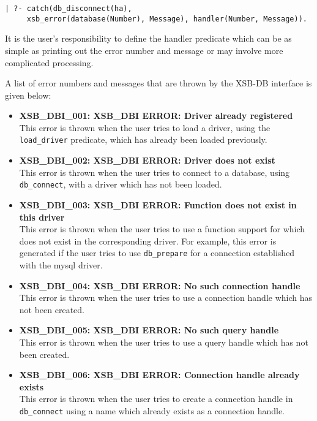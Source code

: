 \begin{verbatim}
| ?- catch(db_disconnect(ha),
     xsb_error(database(Number), Message), handler(Number, Message)).
\end{verbatim}

It is the user's responsibility to define the handler predicate which can be as simple
as printing out the error number and message or may involve more 
complicated  processing.

A list of error numbers and messages that are thrown by the XSB-DB interface
is given below:

\begin{itemize}

\item {\bf XSB\_DBI\_001: XSB\_DBI ERROR: Driver already registered}\\
This error is thrown when the user tries to load a driver, using the {\tt load\_driver} 
predicate, which has already been loaded previously.

\item {\bf XSB\_DBI\_002: XSB\_DBI ERROR: Driver does not exist}\\
This error is thrown when the user tries to connect to a database, using
{\tt db\_connect}, with a driver which has not been loaded.

\item {\bf XSB\_DBI\_003: XSB\_DBI ERROR: Function does not exist in this driver}\\
This error is thrown when the user tries to use a function support 
for which does not exist in the corresponding driver. For example, 
this error is generated if the user
tries to use {\tt db\_prepare} for a connection established with the
mysql driver.

\item {\bf XSB\_DBI\_004: XSB\_DBI ERROR: No such connection handle}\\
This error is thrown when the user tries to use a connection handle
which has not been created.

\item {\bf XSB\_DBI\_005: XSB\_DBI ERROR: No such query handle}\\
This error is thrown when the user tries to use a query handle which has 
not been created.

\item {\bf XSB\_DBI\_006: XSB\_DBI ERROR: Connection handle already exists}\\
This error is thrown when the user tries to create a connection handle in
{\tt db\_connect} using a name which already exists as a connection handle.


\end{itemize}
